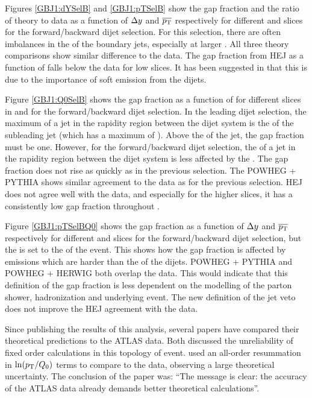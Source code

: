  
Figures \ref{GBJ1:dYSelB} and \ref{GBJ1:pTSelB} show the gap fraction and the ratio of theory to data as a function of $\mbox{$\Delta y$}{}$ and $\mbox{$\overline{p_{\rm T}}$}{}$ respectively for different \ptb{} and \dy{} slices for the forward/backward dijet selection.
For this selection, there are often imbalances in the \pt{} of the boundary jets, especially at larger \ptb{}.
All three theory comparisons show similar difference to the data. 
The gap fraction from HEJ as a function of \dy{} falls below the data for low \ptb{} slices. 
It has been suggested in \cite{ref:Anderson1} that this is due to the importance of soft emission from the dijets.

Figure \ref{GBJ1:Q0SelB} shows the gap fraction as a function of \qz{} for different slices in \dy{} and \ptb{} for the forward/backward dijet selection.
In the leading \pt{} dijet selection, the maximum \pt{} of a jet in the rapidity region between the dijet system is the \pt{} of the subleading jet (which has a maximum \pt{} of \ptb{}).
Above the \ptb{} of the jet, the gap fraction must be one.
However, for the forward/backward dijet selection, the \pt{} of a jet in the rapidity region between the dijet system is less affected by the \ptb{}.
The gap fraction does not rise as quickly as in the previous selection.
The POWHEG + PYTHIA  shows similar agreement to the data as for the previous selection.
HEJ does not agree well with the data, and especially for the higher \dy{} slices, it has a consistently low gap fraction throughout \qz{}. 

Figure \ref{GBJ1:pTSelBQ0} shows the gap fraction as a function of $\mbox{$\Delta y$}{}$ and $\mbox{$\overline{p_{\rm T}}$}{}$ respectively for different \ptb{} and \dy{} slices for the forward/backward dijet selection, but the \qz{} is set to the \ptb{} of the event. 
This shows how the gap fraction is affected by emissions which are harder than the \ptb{} of the  dijets. 
POWHEG + PYTHIA and POWHEG + HERWIG both overlap the data.
This would indicate that this definition of the gap fraction is less dependent on the modelling of the parton shower, hadronization and underlying event.
The new definition of the jet veto does not improve the HEJ agreement with the data.


Since publishing the results of this analysis, several papers \cite{ref:Anderson1,ref:JeffNew} have compared  their theoretical predictions to the ATLAS data. 
Both discussed the unreliability of fixed order calculations in this topology of event.
\cite{ref:JeffNew} used an all-order resummation in $\ln(\mbox{$p_{\rm T}$}{}/\mbox{$Q_0$}{})$ terms to compare to the data, observing a large theoretical uncertainty. 
The conclusion of the paper was: ``The message is clear: the accuracy of the ATLAS data already demands better theoretical calculations''.



